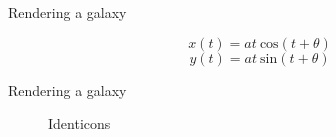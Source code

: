\documentclass{beamer}
\begin{document}
\begin{frame}{Rendering a galaxy}
\begin{minipage}{.60\textwidth}
\noindent{}
\end{minipage}
\begin{minipage}{.35\textwidth}
$$x(t) = at \: \mathrm{cos}(t + \theta)$$
         $$y(t) = at \: \mathrm{sin}(t + \theta)$$
\end{minipage}
\end{frame}
\begin{frame}{Rendering a galaxy}
\begin{figure}[H]
\noindent{}
\caption{Identicons}
\end{figure}
\end{frame}
\end{document}

